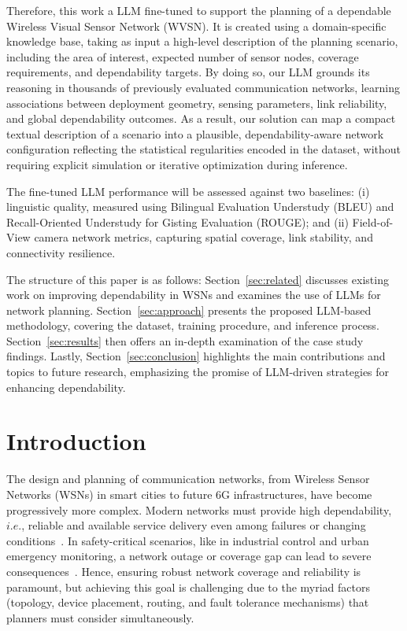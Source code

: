 Therefore, this work a LLM fine-tuned to support the planning of a dependable  Wireless Visual Sensor Network (WVSN). It is created using a domain-specific knowledge base, taking as input a high-level description of the planning scenario, including the area of interest, expected number of sensor nodes, coverage requirements, and dependability targets. By doing so, our LLM grounds its reasoning in thousands of previously evaluated communication networks, learning associations between deployment geometry, sensing parameters, link reliability, and global dependability outcomes. As a result, our solution can map a compact textual description of a scenario into a plausible, dependability-aware network configuration reflecting the statistical regularities encoded in the dataset, without requiring explicit simulation or iterative optimization during inference.


The fine-tuned LLM performance will be assessed against two baselines: (i) linguistic quality, measured using Bilingual Evaluation Understudy (BLEU) and Recall-Oriented Understudy for Gisting Evaluation (ROUGE); and (ii) Field-of-View camera network metrics, capturing spatial coverage, link stability, and connectivity resilience.


The structure of this paper is as follows: Section~\ref{sec:related} discusses existing work on improving dependability in WSNs and examines the use of LLMs for network planning. Section~\ref{sec:approach} presents the proposed LLM-based methodology, covering the dataset, training procedure, and inference process. Section~\ref{sec:results} then offers an in-depth examination of the case study findings. Lastly, Section~\ref{sec:conclusion} highlights the main contributions and topics to future research, emphasizing the promise of LLM-driven strategies for enhancing dependability.






\section{Introduction}
\label{sec:introduction}

The design and planning of communication networks, from Wireless Sensor Networks (WSNs) in smart cities to future 6G infrastructures, have become progressively more complex. Modern networks must provide high dependability, $i.e.$, reliable and available service delivery even among failures or changing conditions~\cite{surveyDependability1,surveyDependability2}. In safety-critical scenarios, like in industrial control and urban emergency monitoring, a network outage or coverage gap can lead to severe consequences~\cite{surveyCoverage1,Jesus2024}. Hence, ensuring robust network coverage and reliability is paramount, but achieving this goal is challenging due to the myriad factors (topology, device placement, routing, and fault tolerance mechanisms) that planners must consider simultaneously. 

